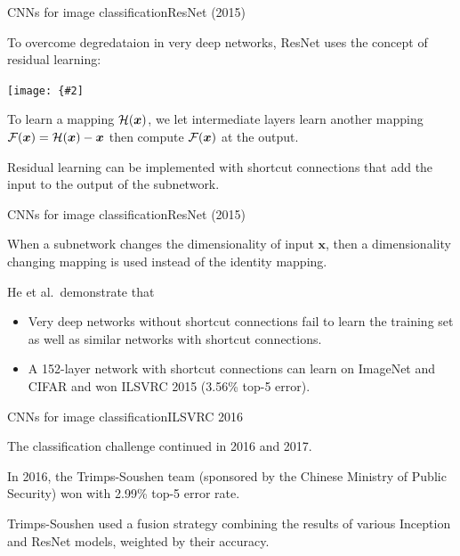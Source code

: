 \documentclass{beamer}
\renewcommand{\vec}[1]{\boldsymbol{#1}}
\newcommand{\myfig}[3]{\centerline{\texttt{[image: \{\#2]}}}
\begin{document}
\begin{frame}{CNNs for image classification}{ResNet (2015)}

  To overcome degredataion in very deep networks, ResNet uses the
  concept of \alert{residual learning}:

  \medskip

  \myfig{2in}{he-fig2}{He et al.\ (2016), Fig.\ 2}

  \medskip

  To learn a mapping ${\cal H}(\vec{x})$, we let intermediate layers
  learn another mapping ${\cal F}(\vec{x}) = {\cal H}(\vec{x})-\vec{x}$
  then compute ${\cal F}(\vec{x})$ at the output.

  \medskip

  Residual learning can be implemented with \alert{shortcut
    connections} that add the input to the output of the subnetwork.
  
\end{frame}


\begin{frame}{CNNs for image classification}{ResNet (2015)}

  When a subnetwork changes the dimensionality of input $\vec{x}$,
  then a dimensionality changing mapping is used instead of the
  identity mapping.

  \medskip
  
  He et al.\ demonstrate that
  \begin{itemize}
    \item Very deep networks without shortcut connections fail to
      learn the training set as well as similar networks with shortcut
      connections.
    \item A \alert{152-layer network} with shortcut connections can
      learn on ImageNet and CIFAR and won ILSVRC 2015 (3.56\% top-5
      error).
  \end{itemize}
  
\end{frame}


\begin{frame}{CNNs for image classification}{ILSVRC 2016}

  The classification challenge continued in 2016 and 2017.

  \medskip

  In 2016, the Trimps-Soushen team (sponsored by the Chinese Ministry
  of Public Security) won with 2.99\% top-5 error rate.

  \medskip

  Trimps-Soushen used a fusion strategy combining the results
  of various Inception and ResNet models, weighted by their accuracy.

\end{frame}
\end{document}
